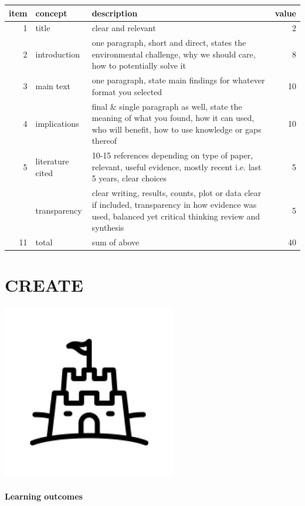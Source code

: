 \documentclass[
]{book}
\begin{document}
\begin{tabular}{rllr}
\toprule
item & concept & description & value\\
\midrule
1 & title & clear and relevant & 2\\
2 & introduction & one paragraph, short and direct, states the environmental challenge, why we should care, how to potentially solve it & 8\\
3 & main text & one paragraph, state main findings for whatever format you selected & 10\\
4 & implications & final \& single paragraph as well, state the meaning of what you found, how it can used, who will benefit, how to use knowledge or gaps thereof & 10\\
5 & literature cited & 10-15 references depending on type of paper, relevant, useful evidence, mostly recent i.e. last 5 years, clear choices & 5\\
\addlinespace
6 & transparency & clear writing, results, counts, plot or data clear if included, transparency in how evidence was used, balanced yet critical thinking review and synthesis & 5\\
11 & total & sum of above & 40\\
\bottomrule
\end{tabular}

\hypertarget{create}{%
\chapter{CREATE}\label{create}}

\includegraphics[width=3in,height=\textheight]{./castle.png}

\hypertarget{learning-outcomes-11}{%
\subsubsection*{Learning outcomes}\label{learning-outcomes-11}}
\end{document}
